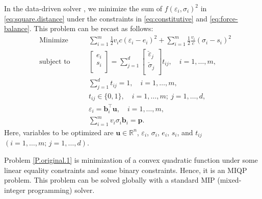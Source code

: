 \documentclass[a4paper,11pt]{scrartcl}
\theoremstyle{plain}
\theoremstyle{definition}
\theoremstyle{remark}
\newcommand{\MIN}{\mathop{\mathrm{Minimize}}}
\newcommand{\ST}{\mathop{\mathrm{subject~to}}}
\renewcommand{\Re}{\ensuremath{\mathbb{R}}}
\newcommand{\bi}[1]{\ensuremath{\boldsymbol{#1}}}
\begin{document}
In the data-driven solver \cite{KO16}, we minimize the sum of 
$f(\varepsilon_{i},\sigma_{i})^{2}$ in \eqref{eq:square.distance} under 
the constraints in \eqref{eq:constitutive} and \eqref{eq:force-balance}. 
This problem can be recast as follows: 
\begin{subequations}\label{P.original.1}\begin{alignat}{3}
    & \MIN  &{\quad}& 
    \sum_{i=1}^{m} \frac{1}{2} v_{i} c (\varepsilon_{i} - e_{i})^{2} 
    + \sum_{i=1}^{m} \frac{1}{2} \frac{v_{i}}{c} (\sigma_{i} - s_{i})^{2} 
    \label{P.original.1.1} \\
    & \ST && 
    \begin{bmatrix}
      e_{i} \\ s_{i} \\
    \end{bmatrix}
    = \sum_{j=1}^{d} 
    \begin{bmatrix}
      \check{\varepsilon}_{j} \\
      \check{\sigma}_{j} \\
    \end{bmatrix}
    t_{ij} , 
    {\quad} i=1,\dots,m, 
    \label{P.original.1.2} \\
    & &&
    \sum_{j=1}^{d} t_{ij} = 1 , 
    {\quad} i=1,\dots,m, \\
    & &&
    t_{ij} \in \{ 0,1 \} , 
    {\quad} i=1,\dots,m; \ j=1,\dots,d , \\
    & &&
    \varepsilon_{i} = \bi{b}_{i}^{\top} \bi{u}, 
    {\quad} i=1,\dots,m, 
    \label{P.original.1.5} \\
    & &&
    \sum_{i=1}^{m} v_{i} \sigma_{i} \bi{b}_{i}= \bi{p} . 
    \label{P.original.1.6}
  \end{alignat}
\end{subequations}
Here, variables to be optimized are 
$\bi{u} \in \Re^{n}$, $\varepsilon_{i}$, $\sigma_{i}$, $e_{i}$, $s_{i}$, 
and $t_{ij}$ $(i=1,\dots,m;\, j=1,\dots,d)$. 

Problem \eqref{P.original.1} is minimization of a convex quadratic 
function under some linear equality constraints and some binary constraints. 
Hence, it is an MIQP problem. 
This problem can be solved globally with a standard MIP 
(mixed-integer programming) solver. 
\end{document}
